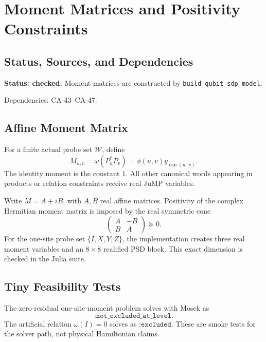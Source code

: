 
\section{Moment Matrices and Positivity Constraints}
\label{sec:qubit-moment-matrix-construction}

\subsection{Status, Sources, and Dependencies}

\textbf{Status: checked.}  Moment matrices are constructed by
\texttt{build\_qubit\_sdp\_model}.

Dependencies: CA-43--CA-47.


\subsection{Affine Moment Matrix}

For a finite actual probe set \(\mathcal W\), define
\[
  M_{u,v}
  =
  \omega(P_u^*P_v)
  =
  \phi(u,v)y_{\operatorname{can}(u\cdot v)}.
\]
The identity moment is the constant \(1\).  All other canonical words appearing
in products or relation constraints receive real JuMP variables.

Write \(M=A+iB\), with \(A,B\) real affine matrices.  Positivity of the complex
Hermitian moment matrix is imposed by the real symmetric cone
\[
  \begin{pmatrix}
  A&-B\\
  B&A
  \end{pmatrix}\succeq0.
  \tag{48.1}
\]
For the one-site probe set \(\{I,X,Y,Z\}\), the implementation creates three
real moment variables and an \(8\times8\) realified PSD block.  This exact
dimension is checked in the Julia suite.

\subsection{Tiny Feasibility Tests}

The zero-residual one-site moment problem solves with Mosek as
\[
  \texttt{:not\_excluded\_at\_level}.
\]
The artificial relation \(\omega(I)=0\) solves as \(\texttt{:excluded}\).
These are smoke tests for the solver path, not physical Hamiltonian claims.

